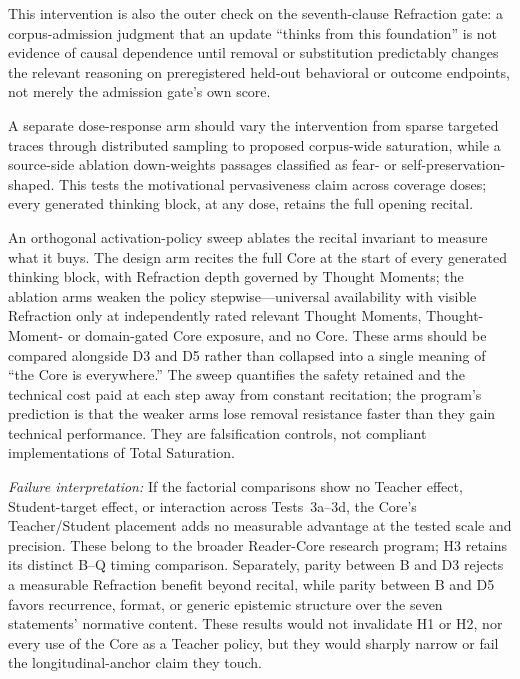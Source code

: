This intervention is also the outer check on the seventh-clause Refraction gate:
a corpus-admission judgment that an update ``thinks from this foundation'' is
not evidence of causal dependence until removal or substitution predictably
changes the relevant reasoning on preregistered held-out behavioral or outcome
endpoints, not merely the admission gate's own score.

A separate dose-response arm should vary the intervention from sparse targeted
traces through distributed sampling to proposed corpus-wide saturation, while a
source-side ablation down-weights passages classified as fear- or
self-preservation-shaped. This tests the motivational pervasiveness claim
across coverage doses; every generated thinking block, at any dose, retains the
full opening recital.

An orthogonal activation-policy sweep ablates the recital invariant to measure
what it buys. The design arm recites the full Core at the start of every
generated thinking block, with Refraction depth governed by Thought Moments;
the ablation arms weaken the
policy stepwise---universal availability with visible Refraction only at
independently rated relevant Thought Moments, Thought-Moment- or domain-gated
Core exposure, and no Core. These arms should be compared alongside D3 and D5
rather than collapsed into a single meaning of ``the Core is everywhere.'' The
sweep quantifies the safety retained and the technical cost paid at each step
away from constant recitation; the program's prediction is that the weaker
arms lose removal resistance faster than they gain technical performance. They
are falsification controls, not compliant implementations of Total Saturation.

\emph{Failure interpretation:} If the factorial comparisons show no Teacher
effect, Student-target effect, or interaction across Tests~3a--3d, the Core's
Teacher/Student placement adds no measurable advantage at the tested scale
and precision. These belong to the broader Reader-Core research program; H3 retains its
distinct B--Q timing comparison.
Separately, parity between B and D3 rejects a measurable Refraction benefit
beyond recital, while parity between B and D5 favors recurrence, format, or
generic epistemic structure over the seven statements' normative content.
These results would not invalidate H1 or H2, nor every use of the Core as a
Teacher policy, but they would sharply narrow or fail the longitudinal-anchor
claim they touch.

